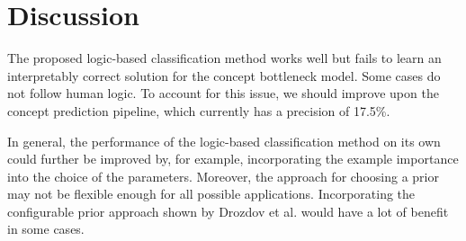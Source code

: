 \section{Discussion}

The proposed logic-based classification method works well but fails to learn an interpretably correct solution for the concept bottleneck model. Some cases do not 
follow human logic.
To account for this issue, we should improve upon the concept prediction pipeline, which currently has a precision of 17.5\%.

In general, the performance of the logic-based classification method on its own could further be improved by, for example, incorporating the example importance into the choice of the parameters.
Moreover, the approach for choosing a prior may not be flexible enough for all possible applications.
Incorporating the configurable prior approach shown by Drozdov et al. \cite{RefWorks:RefID:67-drozdov2021online} would have a lot of benefit in some cases.

